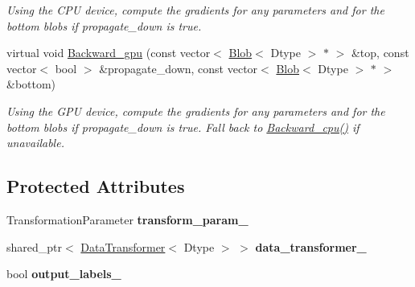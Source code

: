 \begin{DoxyCompactItemize}
\begin{DoxyCompactList}\small\item\em Using the C\+PU device, compute the gradients for any parameters and for the bottom blobs if propagate\+\_\+down is true. \end{DoxyCompactList}\item 
virtual void \hyperlink{classcaffe_1_1BaseDataLayer_aa470016d58cfca4d75d1f3519e91d792}{Backward\+\_\+gpu} (const vector$<$ \hyperlink{classcaffe_1_1Blob}{Blob}$<$ Dtype $>$ $\ast$ $>$ \&top, const vector$<$ bool $>$ \&propagate\+\_\+down, const vector$<$ \hyperlink{classcaffe_1_1Blob}{Blob}$<$ Dtype $>$ $\ast$ $>$ \&bottom)\hypertarget{classcaffe_1_1BaseDataLayer_aa470016d58cfca4d75d1f3519e91d792}{}\label{classcaffe_1_1BaseDataLayer_aa470016d58cfca4d75d1f3519e91d792}

\begin{DoxyCompactList}\small\item\em Using the G\+PU device, compute the gradients for any parameters and for the bottom blobs if propagate\+\_\+down is true. Fall back to \hyperlink{classcaffe_1_1BaseDataLayer_ac0e1c8936407164b04aa98c11c36a22c}{Backward\+\_\+cpu()} if unavailable. \end{DoxyCompactList}\end{DoxyCompactItemize}
\subsection*{Protected Attributes}
\begin{DoxyCompactItemize}
\item 
Transformation\+Parameter {\bfseries transform\+\_\+param\+\_\+}\hypertarget{classcaffe_1_1BaseDataLayer_a325727e5c4f305a3ffa5c8efc211a1c9}{}\label{classcaffe_1_1BaseDataLayer_a325727e5c4f305a3ffa5c8efc211a1c9}

\item 
shared\+\_\+ptr$<$ \hyperlink{classcaffe_1_1DataTransformer}{Data\+Transformer}$<$ Dtype $>$ $>$ {\bfseries data\+\_\+transformer\+\_\+}\hypertarget{classcaffe_1_1BaseDataLayer_a8c0e6fd07b912dd62087024a5ddeaa00}{}\label{classcaffe_1_1BaseDataLayer_a8c0e6fd07b912dd62087024a5ddeaa00}

\item 
bool {\bfseries output\+\_\+labels\+\_\+}\hypertarget{classcaffe_1_1BaseDataLayer_a802076913164842d1f698014b489ca2e}{}\label{classcaffe_1_1BaseDataLayer_a802076913164842d1f698014b489ca2e}

\end{DoxyCompactItemize}
